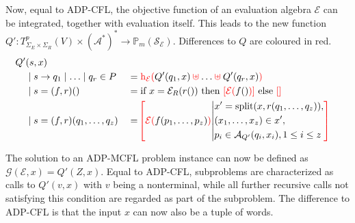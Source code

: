 \documentclass[
    a4paper,
    12pt,
    twoside,
    BCOR=12mm,
    parskip=half,
    chapterprefix,
    numbers=noenddot,
    bibliography=totoc
]{scrbook}
\begin{document}
Now, equal to ADP-CFL, the objective function of an evaluation algebra $\mathcal{E}$ can be integrated, together with evaluation itself. This leads to the new function $Q': T^p_{\Sigma_E \times \Sigma_R}(V) \times (\mathcal{A}^*)^* \to \mathbb{P}_m(\mathcal{S}_\mathcal{E})$. Differences to $Q$ are coloured in red.
\begin{align}
	Q'&(s,x) \label{eq:q'_mcfl}\\
	&\mid s \to q_1 \mid \ldots \mid q_r \in P &&= \textcolor{red}{\op{h}_\mathcal{E}(} Q'(q_1,x) \mathbin{\textcolor{red}{\uplus}} \ldots \mathbin{\textcolor{red}{\uplus}} Q'(q_r,x) \textcolor{red}{)} \nonumber\\
	&\mid s=(f,r)() &&= \text{if $x=\mathcal{E}_R(r())$ then $\textcolor{red}{[\mathcal{E}(}f()\textcolor{red}{)]}$ else $\textcolor{red}{[]}$} \nonumber\\
	&\mid s=(f,r)(q_1,\ldots,q_z) &&= \color{red} \!\left[ \color{black} \textcolor{red}{\mathcal{E}(}f(p_1,\ldots,p_z)\textcolor{red}{)} \middle\vert \color{black}
			\begin{aligned}
			  &x' = \op{split}(x,r(q_1,\ldots,q_z)),\\
				&(x_1,\ldots,x_z) \in x',\\
				&p_i \in \mathcal{A}_{Q'}(q_i,x_i),1 \leq i \leq z
			\end{aligned}
			\color{red} \right] \nonumber
\end{align}

The solution to an ADP-MCFL problem instance can now be defined as $\mathcal{G}(\mathcal{E},x)=Q'(Z,x)$. Equal to ADP-CFL, subproblems are characterized as calls to $Q'(v,x)$ with $v$ being a nonterminal, while all further recursive calls not satisfying this condition are regarded as part of the subproblem. The difference to ADP-CFL is that the input $x$ can now also be a tuple of words.
\end{document}

